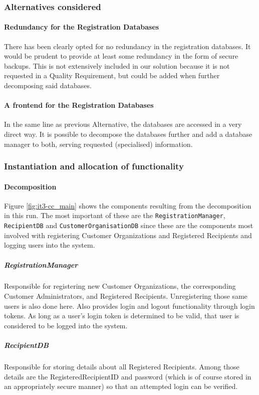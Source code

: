 \documentclass[a4paper,10pt]{article}
\begin{document}
\subsubsection*{Alternatives considered}
\paragraph{Redundancy for the Registration Databases}
There has been clearly opted for no redundancy in the registration databases. It would be prudent to provide at least some redundancy in the form of secure backups. This is not extensively included in our solution because it is not requested in a Quality Requirement, but could be added when further decomposing said databases.

\paragraph{A frontend for the Registration Databases}
In the same line as previous Alternative, the databases are accessed in a very direct way. It is possible to decompose the databases further and add a database manager to both, serving requested (specialised) information.

\subsubsection{Instantiation and allocation of functionality}
\paragraph{Decomposition}
Figure \ref{fig:it3-cc_main} shows the components resulting from the decomposition in this run. The most important of these are the \texttt{RegistrationManager}, \texttt{RecipientDB} and \texttt{CustomerOrganisationDB} since these are the components most involved with registering Customer Organizations and Registered Recipients and logging users into the system.

\subparagraph{RegistrationManager}
Responsible for registering new Customer Organizations, the corresponding Customer Administrators, and Registered Recipients. Unregistering those same users is also done here. Also provides login and logout functionality through login tokens. As long as a user's login token is determined to be valid, that user is considered to be logged into the system.

\subparagraph{RecipientDB}
Responsible for storing details about all Registered Recipients. Among those details are the RegisteredRecipientID and password (which is of course stored in an appropriately secure manner) so that an attempted login can be verified.
\end{document}
